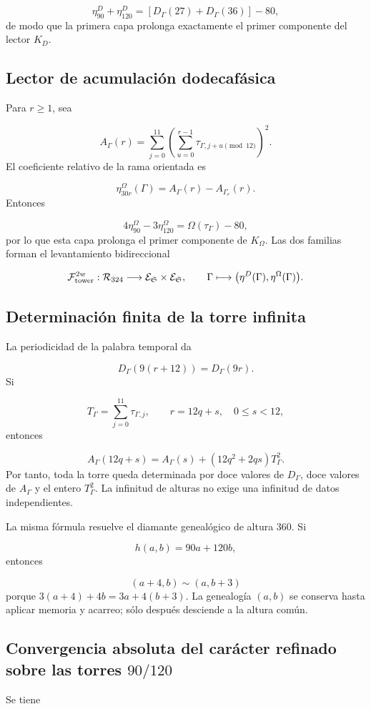 \[
 \eta_{90}^{D}+\eta_{120}^{D}
 =[D_\Gamma(27)+D_\Gamma(36)]-80,
\]
de modo que la primera capa prolonga exactamente el primer componente del lector \(K_D\).

\subsection{Lector de acumulación dodecafásica}
Para \(r\ge1\), sea

\[
 A_\Gamma(r)=
 \sum_{j=0}^{11}
 \left(
 \sum_{u=0}^{r-1}
 \tau_{\Gamma,j+u\!\!\!\pmod{12}}
 \right)^2.
\]
El coeficiente relativo de la rama orientada es

\[
 \boxed{\eta_{30r}^{\Omega}(\Gamma)
 =A_\Gamma(r)-A_{\Gamma_e}(r).}
\]
Entonces

\[
 4\eta_{90}^{\Omega}-3\eta_{120}^{\Omega}
 =\Omega(\tau_\Gamma)-80,
\]
por lo que esta capa prolonga el primer componente de \(K_\Omega\). Las dos familias forman el levantamiento bidireccional

\[
 \mathcal F_{\rm tower}^{2w}:
 \mathcal R_{324}\longrightarrow
 \mathcal E_{\mathfrak S}\times\mathcal E_{\mathfrak S},
 \qquad
 \Gamma\longmapsto
 \bigl(\eta^D(\Gamma),\eta^\Omega(\Gamma)\bigr).
\]
\subsection{Determinación finita de la torre infinita}
La periodicidad de la palabra temporal da

\[
 D_\Gamma(9(r+12))=D_\Gamma(9r).
\]
Si

\[
 T_\Gamma=\sum_{j=0}^{11}\tau_{\Gamma,j},
 \qquad r=12q+s,\quad 0\le s<12,
\]
entonces

\[
 A_\Gamma(12q+s)
 =A_\Gamma(s)+(12q^2+2qs)T_\Gamma^2.
\]
Por tanto, toda la torre queda determinada por doce valores de \(D_\Gamma\), doce valores de \(A_\Gamma\) y el entero \(T_\Gamma^2\). La infinitud de alturas no exige una infinitud de datos independientes.

La misma fórmula resuelve el diamante genealógico de altura 360. Si

\[
 h(a,b)=90a+120b,
\]
entonces

\[
 (a+4,b)\sim(a,b+3)
\]
porque \(3(a+4)+4b=3a+4(b+3)\). La genealogía \((a,b)\) se conserva hasta aplicar memoria y acarreo; sólo después desciende a la altura común.

\subsection{Convergencia absoluta del carácter refinado sobre las torres \(90/120\)}
Se tiene

